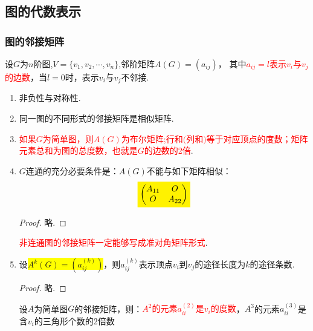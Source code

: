 \subsection{图的代数表示}
\subsubsection{图的邻接矩阵}

\begin{definition}
设$G$为$n$阶图,$V=\{v_1, v_2, \cdots, v_n\}$,邻阶矩阵$A(G)=(a_{ij})$，
其中\textcolor{red}{$a_{ij}=l$表示$v_i$与$v_j$的边数}，当$l=0$时，表示$v_i$与$v_j$不邻接.
\end{definition}
\noindent {\bfseries \textcolor{ecolor}{性质：}}

\begin{enumerate}
\item 非负性与对称性.
\item 同一图的不同形式的邻接矩阵是相似矩阵.
\item \textcolor{red}{如果$G$为简单图，则$A(G)$为布尔矩阵;行和$($列和$)$等于对应顶点的度数；矩阵元素总和为图的总度数，也就是$G$的边数的2倍}.
\item $G$连通的充分必要条件是：$A(G)$不能与如下矩阵相似：
\[	
\colorbox{yellow}{$
\begin{pmatrix}
	A_{11}& O\\
	O&A_{22}\\
\end{pmatrix}
$}
\]
\begin{proof}
	略.
\end{proof}
\begin{note}
\textcolor{red}{非连通图的邻接矩阵一定能够写成准对角矩阵形式}.
\end{note}
\item 

\begin{theorem}
	设\colorbox{yellow}{$A^{k}(G) = (a_{ij}^{(k)}) $}，则$a_{ij}^{(k)}$表示顶点$v_i$到$v_j$的途径长度为$k$的途径条数.
\end{theorem}
\begin{proof}
略.
\end{proof}
\begin{corollary}
设$A$为简单图$G$的邻接矩阵，则：\textcolor{red}{$A^2$的元素$a_{ii}^{(2)}$是$v_i$的度数}，$A^3$的元素$a_{ii}^{(3)}$是含$v_i$的三角形个数的2倍数
\end{corollary}
\end{enumerate}

